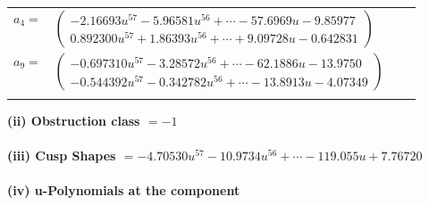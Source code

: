 \documentclass[1p]{elsarticle_modified}
\theoremstyle{definition}
\begin{document}
\begin{tabular}{m{7pt} m{180pt} m{7pt} m{180pt} }
\flushright $a_{4}=$&$\begin{pmatrix}-2.16693 u^{57}-5.96581 u^{56}+\cdots-57.6969 u-9.85977\\0.892300 u^{57}+1.86393 u^{56}+\cdots+9.09728 u-0.642831\end{pmatrix}$ \\
\flushright $a_{9}=$&$\begin{pmatrix}-0.697310 u^{57}-3.28572 u^{56}+\cdots-62.1886 u-13.9750\\-0.544392 u^{57}-0.342782 u^{56}+\cdots-13.8913 u-4.07349\end{pmatrix}$\\&\end{tabular}
\flushleft \textbf{(ii) Obstruction class $= -1$}\\~\\
\flushleft \textbf{(iii) Cusp Shapes $= -4.70530 u^{57}-10.9734 u^{56}+\cdots-119.055 u+7.76720$}\\~\\
\newpage\renewcommand{\arraystretch}{1}
\flushleft \textbf{(iv) u-Polynomials at the component}\newline \\
\end{document}
